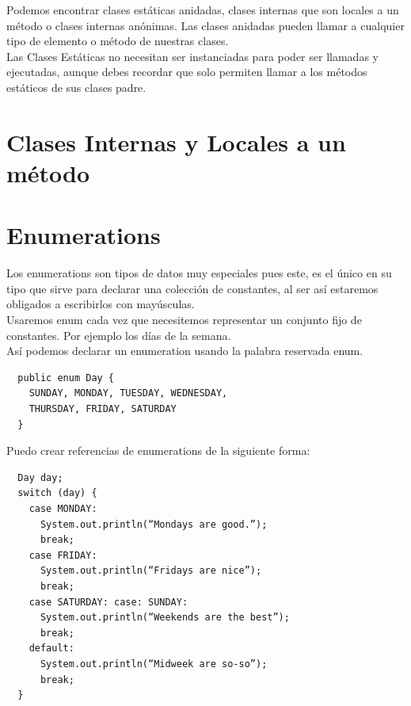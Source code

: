 \documentclass{article}
\begin{document}
Podemos encontrar clases estáticas anidadas, clases internas que son locales a
un método o clases internas anónimas. Las clases anidadas pueden llamar a
cualquier tipo de elemento o método de nuestras clases.\\

Las Clases Estáticas no necesitan ser instanciadas para poder ser llamadas y
ejecutadas, aunque debes recordar que solo permiten llamar a los métodos
estáticos de sus clases padre.\\


















\section{Clases Internas y Locales a un método}%


\section{Enumerations}%
Los enumerations son tipos de datos muy especiales pues este, es el único en su
tipo que sirve para declarar una colección de constantes, al ser así estaremos
obligados a escribirlos con mayúsculas.\\

Usaremos enum cada vez que necesitemos representar un conjunto fijo de
constantes. Por ejemplo los días de la semana.\\

Así podemos declarar un enumeration usando la palabra reservada enum.\\

\begin{verbatim}
  public enum Day {
    SUNDAY, MONDAY, TUESDAY, WEDNESDAY,
    THURSDAY, FRIDAY, SATURDAY
  }
\end{verbatim}

Puedo crear referencias de enumerations de la siguiente forma:\\

\begin{verbatim}
  Day day;
  switch (day) {
    case MONDAY:
      System.out.println(“Mondays are good.”);
      break;
    case FRIDAY:
      System.out.println(“Fridays are nice”);
      break;
    case SATURDAY: case: SUNDAY:
      System.out.println(“Weekends are the best”);
      break;
    default:
      System.out.println(“Midweek are so-so”);
      break;
  }
\end{verbatim}
\end{document}
